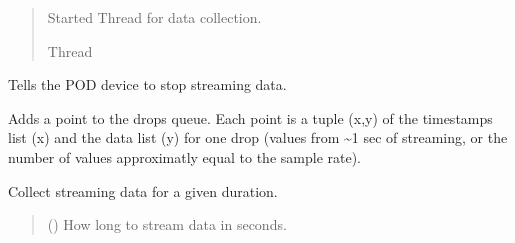 \documentclass[letterpaper,10pt,english]{sphinxmanual}
\begin{document}
\begin{fulllineitems}
\begin{fulllineitems}
\begin{quote}
\begin{description}
\sphinxAtStartPar
Started Thread for data collection.

\sphinxAtStartPar
Thread

\end{description}\end{quote}

\end{fulllineitems}


\begin{fulllineitems}
\label{\detokenize{PodApi.Stream.Collect:PodApi.Stream.Collect.DataBucket.Bucket.StopCollecting}}
\pysigstartsignatures
{}
\pysigstopsignatures
\sphinxAtStartPar
Tells the POD device to stop streaming data.

\end{fulllineitems}


\begin{fulllineitems}
\label{\detokenize{PodApi.Stream.Collect:PodApi.Stream.Collect.DataBucket.Bucket._CollectDrop}}
\pysigstartsignatures
{}
\pysigstopsignatures
\sphinxAtStartPar
Adds a point to the drops queue. Each point is a tuple (x,y) of the         timestamps list (x) and the data list (y) for one drop (values from         \textasciitilde{}1 sec of streaming, or the number of values approximatly equal to         the sample rate).

\end{fulllineitems}


\begin{fulllineitems}
\label{\detokenize{PodApi.Stream.Collect:PodApi.Stream.Collect.DataBucket.Bucket._CollectForDuration}}
\pysigstartsignatures
{}
\pysigstopsignatures
\sphinxAtStartPar
Collect streaming data for a given duration.
\begin{quote}\begin{description}
\sphinxAtStartPar
{} () \textendash{} How long to stream data in seconds.


\end{description}
\end{quote}
\end{fulllineitems}
\end{fulllineitems}
\end{document}

